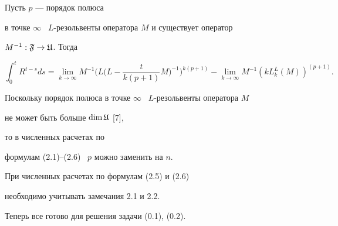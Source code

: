 \begin{thms}


Пусть $p$ --- порядок полюса


в точке $\infty$ \ $L$-резольвенты оператора $M$ и существует оператор


$M^{-1} : {\frak F}\to{\frak U}$. Тогда


\begin{equation}


\displaystyle{\int_0^t }R^{t-s} ds =


\lim_{k\to\infty} M^{-1} \bigg(L\bigg(L - \frac{t}{k(p+1)} M\bigg)^{-1}


\bigg)^{k(p+1)} -


\lim_{k\to\infty} M^{-1} (kL_k^L (M))^{(p+1)}.


\end{equation}


\end{thms}





\begin{notes}


Поскольку порядок полюса в точке $\infty$ \ $L$-резольвенты оператора $M$


не может быть больше $\dim {\frak U}$ [7],


то в численных расчетах по


формулам (2.1)--(2.6) \ $p$ можно заменить на $n$.


\end{notes}





\begin{notes}


При численных расчетах по формулам (2.5) и (2.6)


необходимо учитывать замечания 2.1 и 2.2.


\end{notes}





Теперь все готово для решения задачи (0.1), (0.2).





